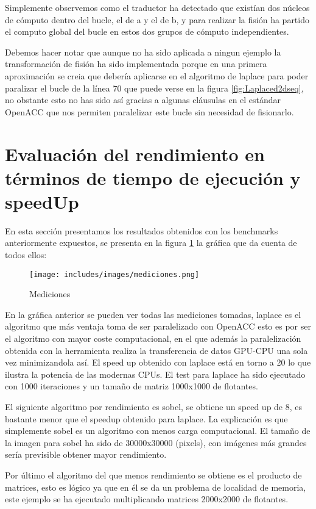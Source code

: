 Simplemente observemos como el traductor ha detectado que existían dos núcleos de cómputo dentro del bucle, el de a y el de b, y para realizar la fisión ha partido el computo global del bucle en estos dos grupos de cómputo independientes.

Debemos hacer notar que aunque no ha sido aplicada a ningun ejemplo la transformación de fisión ha sido implementada porque en una primera aproximación se creia que debería aplicarse en el algoritmo de laplace para poder paralizar el bucle de la línea 70 que puede verse en la figura \ref{fig:Laplaced2dseq}, no obstante esto no has sido así gracias a algunas cláusulas en el estándar OpenACC que nos permiten paralelizar este bucle sin necesidad de fisionarlo.

\section{Evaluación del rendimiento en términos de tiempo de ejecución y speedUp}

En esta sección presentamos los resultados obtenidos con los benchmarks anteriormente expuestos, se presenta en la figura \ref{fig:Mediciones} la gráfica que da cuenta de todos ellos:

\begin{figure}[tp]
\centering
\texttt{[image: includes/images/mediciones.png]}
\caption{Mediciones}
\label{fig:Mediciones}
\end{figure}

En la gráfica anterior se pueden ver todas las mediciones tomadas, laplace es el algoritmo que más ventaja toma de ser paralelizado con OpenACC esto es por ser el algoritmo con mayor coste computacional, en el que además la paralelización obtenida con la herramienta realiza la transferencia de datos GPU-CPU una sola vez minimizandola así. El speed up obtenido con laplace está en torno a 20 lo que ilustra la potencia de las modernas CPUs. El test para laplace ha sido ejecutado con 1000 iteraciones y un tamaño de matriz 1000x1000 de flotantes.

El siguiente algoritmo por rendimiento es sobel, se obtiene un speed up de 8, es bastante menor que el speedup obtenido para laplace. La explicación es que simplemente sobel es un algoritmo con menos carga computacional.
El tamaño de la imagen para sobel ha sido de 30000x30000 (pixels), con imágenes más grandes sería previsible obtener mayor rendimiento.

Por último el algoritmo del que menos rendimiento se obtiene es el producto de matrices, esto es lógico ya que en él se da un problema de localidad de memoria, este ejemplo se ha ejecutado multiplicando matrices 2000x2000 de flotantes.


